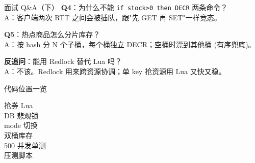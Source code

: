 \begin{frame}{面试 Q\&A（下）}
\textbf{Q4}：为什么不能 \texttt{if stock>0 then DECR} 两条命令？\\
\hspace{4mm}\small A：客户端两次 RTT 之间会被插队，跟"先 GET 再 SET"一样竞态。

\vspace{2mm}
\textbf{Q5}：热点商品怎么分片库存？\\
\hspace{4mm}\small A：按 hash 分 N 个子桶，每个桶独立 DECR；空桶时漂到其他桶 (有序兜底)。

\vspace{2mm}
\textbf{反追问}：能用 Redlock 替代 Lua 吗？\\
\hspace{4mm}\small A：不该。Redlock 用来跨资源协调；单 key 抢资源用 Lua 又快又稳。
\end{frame}

\begin{frame}{代码位置一览}
\begin{description}
  \item[抢券 Lua]
  \item[DB 悲观锁]
  \item[mode 切换]
  \item[双桶库存]
  \item[500 并发单测]
  \item[压测脚本]
\end{description}
\vspace{2mm}
\end{frame}


